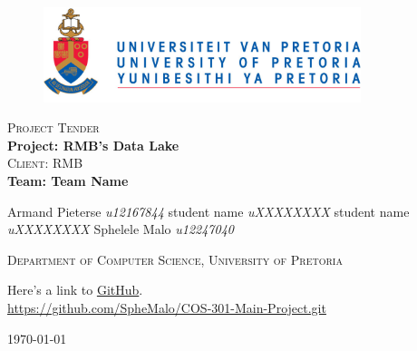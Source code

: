 \begin{titlepage}
	\begin{center}
		
		\begin{figure}[t]
			\centering
			\includegraphics[width=350px]{images/UP_Logo.png}
		\end{figure}
		
		\textsc{\large Project Tender} \\ 
		\vspace{2cm}
		\textbf{\Huge Project: RMB's Data Lake} \\ 
		\textsc{\large Client: RMB} \\ 
		\vspace{2cm}
		\textbf{\Huge Team: Team Name } \\ 
		
		\begin{flushright} \large
			Armand Pieterse \emph{u12167844} \newline
			student name 		\emph{uXXXXXXXX} \newline
			student name		\emph{uXXXXXXXX} \newline
			Sphelele Malo 	\emph{u12247040} \newline
			\end{flushright}
		\textsc{\small Department of Computer Science, University of Pretoria}
		
		\vfill
		
	Here's a link to \href{https://github.com/SpheMalo/COS-301-Main-Project.git}{GitHub}.\\
	\url{https://github.com/SpheMalo/COS-301-Main-Project.git}

	\vfill

	{\large \today}		
		
		
	\end{center}
\end{titlepage}
